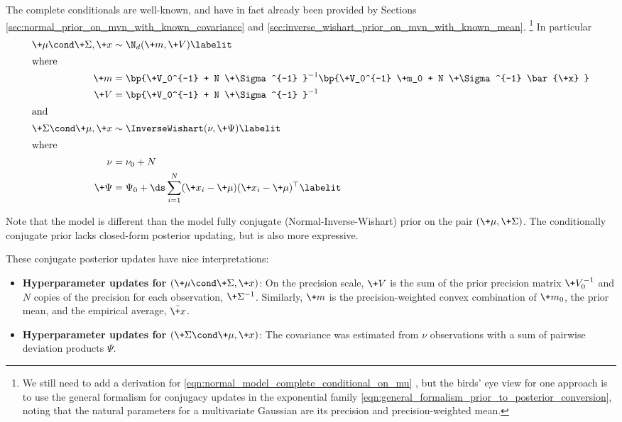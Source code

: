 \documentclass{article} %
\begin{document}
The complete conditionals are well-known,  and have in fact already been provided by Sections  \ref{sec:normal_prior_on_mvn_with_known_covariance} and \ref{sec:inverse_wishart_prior_on_mvn_with_known_mean}. \footnote{We still need to add a derivation for \eqref{eqn:normal_model_complete_conditional_on_mu} ,  but the birds' eye view for one approach is to use the general formalism for conjugacy updates in the exponential family \eqref{eqn:general_formalism_prior_to_posterior_conversion},  noting that the natural parameters for a multivariate Gaussian are its precision and precision-weighted mean. }    In particular
\begin{align*}
\+\mu  \cond \+\Sigma, \+x &\sim \N_{d}(\+m,\+V )  \labelit\label{eqn:normal_model_complete_conditional_on_mu} \\
\intertext{where}
\+m  &=  \bp{\+V_0^{-1} + N  \+\Sigma^{-1} }^{-1}  \bp{\+V_0^{-1} \+m_0 + N \+\Sigma^{-1}  \bar{\+x} } \\
\+V &= \bp{\+V_0^{-1} +  N \+\Sigma^{-1} }^{-1} \\
\intertext{and}
\+\Sigma \cond \+\mu,  \+x  &\sim \InverseWishart(\nu,  \+\Psi) 
\labelit \label{eqn:normal_model_complete_conditional_on_Sigma} \\
\intertext{where}
\nu &=  \nu_0 + N \\
\+\Psi &= \Psi_0 + \ds\sum_{i=1}^N  (\+x_i - \+\mu) (\+x_i - \+\mu)^\top 
\labelit \label{eqn:Sigma_cc_normal_model_cond_conj_prior}\\ 
\end{align*}

Note that the model is different than the model  fully conjugate (Normal-Inverse-Wishart) prior on the pair $(\+\mu, \+\Sigma)$.   The conditionally conjugate prior lacks closed-form posterior updating,  but is also more expressive. 

These conjugate posterior updates have nice interpretations:
\begin{itemize}
\item \textbf{Hyperparameter updates for $(\+\mu  \cond \+\Sigma, \+x)$}: On the precision scale,  $\+V$ is the sum of the prior precision matrix $\+V_0^{-1}$ and $N$ copies of the precision for each observation,  $\+\Sigma^{-1}$.    Similarly,  $\+m$ is the precision-weighted convex combination of $\+m_0$, the prior mean,    and the empirical average, $\bar{\+x}$.
\item \textbf{Hyperparameter updates for $(\+\Sigma \cond \+\mu,  \+x)$}:  The covariance was estimated from $\nu$ observations with a sum of pairwise deviation products $\Psi$.
\end{itemize}
\end{document}
